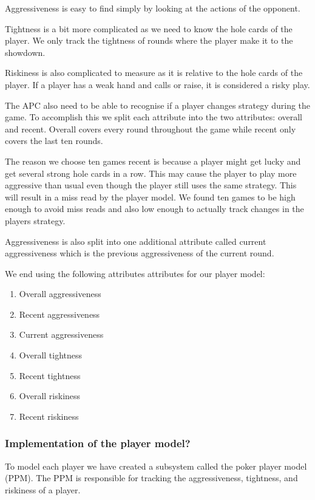 Aggressiveness is easy to find simply by looking at the actions of the opponent. 

Tightness is a bit more complicated as we need to know the hole cards of the player. We only track the tightness of rounds where the player make it to the showdown.

Riskiness is also complicated to measure as it is relative to the hole cards of the player. If a player has a weak hand and calls or raise, it is considered a risky play.  

The APC also need to be able to recognise if a player changes strategy during the game. To accomplish this we split each attribute into the two attributes: overall and recent. Overall covers every round throughout the game while recent only covers the last ten rounds.

The reason we choose ten games recent is because a player might get lucky and get several strong hole cards in a row. This may cause the player to play more aggressive than usual even though the player still uses the same strategy. This will result in a miss read by the player model. We found ten games to be high enough to avoid miss reads and also low enough to actually track changes in the players strategy.

Aggressiveness is also split into one additional attribute called current aggressiveness which is the previous aggressiveness of the current round.

We end using the following attributes attributes for our player model:
\begin{enumerate}
\item Overall aggressiveness
\item Recent aggressiveness
\item Current aggressiveness
\item Overall tightness
\item Recent tightness
\item Overall riskiness
\item Recent riskiness
\end{enumerate}

\subsubsection{Implementation of the player model?}
To model each player we have created a subsystem called the poker player model (PPM). The PPM is responsible for tracking the aggressiveness, tightness, and riskiness of a player.

